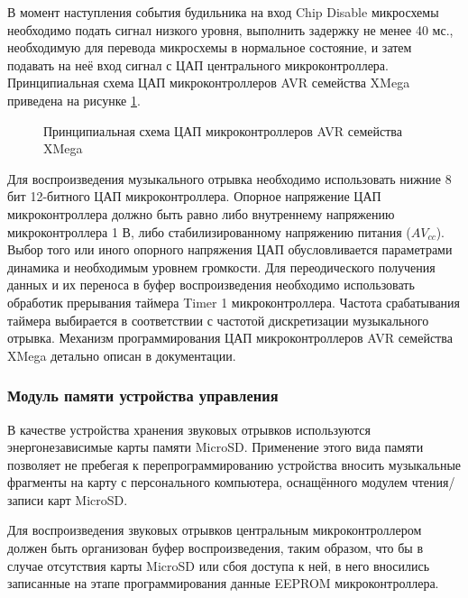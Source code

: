 \begin{par}
В момент наступления события будильника на вход Chip Disable микросхемы необходимо подать сигнал 
низкого уровня, выполнить задержку не менее 40 мс., необходимую для перевода микросхемы в
нормальное состояние, и затем подавать на неё вход сигнал с ЦАП центрального микроконтроллера.
Принципиальная схема ЦАП микроконтроллеров AVR семейства XMega приведена на рисунке \ref{img:avrdacp}.
\begin{figure}[h]
	\caption{Принципиальная схема ЦАП микроконтроллеров AVR семейства XMega}
	\label{img:avrdacp}
\end{figure}
\end{par}

\begin{par}
Для воспроизведения музыкального отрывка необходимо использовать нижние 8 бит 12-битного
ЦАП микроконтроллера. Опорное напряжение ЦАП микроконтроллера должно быть равно либо внутреннему
напряжению микроконтроллера 1 В, либо стабилизированному напряжению питания ($AV_{cc}$). Выбор того или иного
опорного напряжения ЦАП обусловливается параметрами динамика и необходимым уровнем громкости.
Для переодического получения данных и их переноса в буфер воспроизведения необходимо использовать
обработик прерывания таймера Timer 1 микроконтроллера. Частота срабатывания таймера выбирается
в соответствии с частотой дискретизации музыкального отрывка.
Механизм программирования ЦАП микроконтроллеров AVR семейства XMega детально описан в документации\cite{avrdac}.
\end{par}

\subsubsection{Модуль памяти устройства управления}
\begin{par}
В качестве устройства хранения звуковых отрывков используются энергонезависимые карты
памяти MicroSD. Применение этого вида памяти позволяет не пребегая к перепрограммированию устройства
вносить музыкальные фрагменты на карту с персонального компьютера, оснащённого модулем
чтения/записи карт MicroSD.
\end{par}

\begin{par}
Для воспроизведения звуковых отрывков центральным микроконтроллером должен быть
организован буфер воспроизведения, таким образом, что бы в случае отсутствия карты MicroSD или
сбоя доступа к ней, в него вносились записанные на этапе программирования данные EEPROM микроконтроллера.
\end{par}

